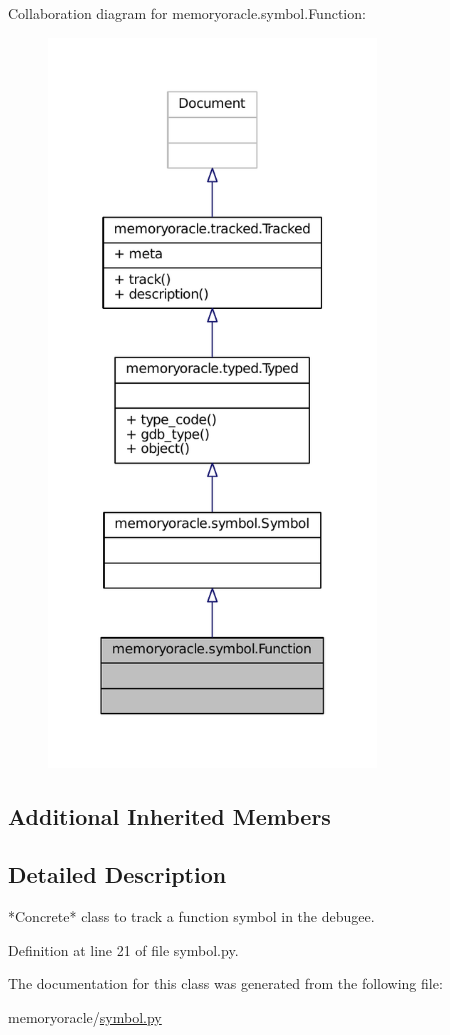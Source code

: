 Collaboration diagram for memoryoracle.\+symbol.\+Function\+:
\nopagebreak
\begin{figure}[H]
\begin{center}
\leavevmode
\includegraphics[width=247pt]{classmemoryoracle_1_1symbol_1_1Function__coll__graph}
\end{center}
\end{figure}
\subsection*{Additional Inherited Members}


\subsection{Detailed Description}
\begin{DoxyVerb}*Concrete* class to track a function symbol in the debugee.
\end{DoxyVerb}
 

Definition at line 21 of file symbol.\+py.



The documentation for this class was generated from the following file\+:\begin{DoxyCompactItemize}
\item 
memoryoracle/\hyperlink{symbol_8py}{symbol.\+py}\end{DoxyCompactItemize}
